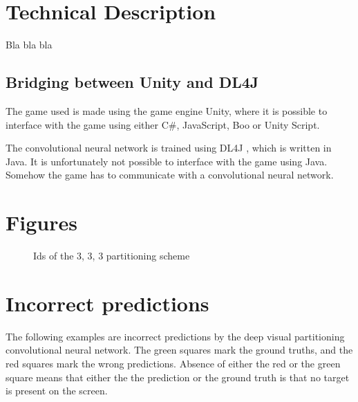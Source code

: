 
\section{Technical Description}
Bla bla bla

\subsection{Bridging between Unity and DL4J}
The game used is made using the game engine Unity, where it is possible to interface with the game using either C\#, JavaScript, Boo or Unity Script.

The convolutional neural network is trained using DL4J , which is written in Java.
It is unfortunately not possible to interface with the game using Java. Somehow the game has to communicate with a convolutional neural network.

\section{Figures}

\begin{figure}[H]
	\begin{scriptsize}
		\sffamily
		\def\svgwidth{\textwidth}
		
	\end{scriptsize}
	\caption{Ids of the 3, 3, 3 partitioning scheme}
	\label{fig:ids}
\end{figure}

\section{Incorrect predictions}
The following examples are incorrect predictions by the deep visual partitioning convolutional neural network. The green squares mark the ground truths, and the red squares mark the wrong predictions. Absence of either the red or the green square means that either the the prediction  or the ground truth is that no target is present on the screen.

\begin{figure}[H]
	\begin{scriptsize}
		\sffamily
		\def\svgwidth{\textwidth}
		
	\end{scriptsize}
	\label{fig:ids}
\end{figure}

\begin{figure}[H]
	\begin{scriptsize}
		\sffamily
		\def\svgwidth{\textwidth}
		
	\end{scriptsize}
	\label{fig:ids}
\end{figure}